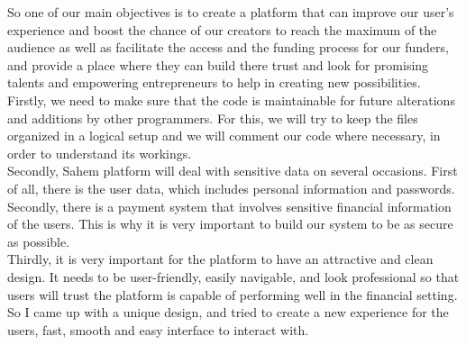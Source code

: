 So one of our main objectives is to create a platform that can improve our user's experience and boost the chance of our creators to reach the maximum of the audience as well as facilitate the access and the funding process for our funders, and provide a place where they can build there trust and look for promising talents and empowering entrepreneurs to help in creating new possibilities.\\
Firstly, we need to make sure
that the code is maintainable for future alterations and additions by other programmers. For this, we will try
to keep the files organized in a logical setup and we will comment our code where necessary, in order to understand
its workings.\\
Secondly, Sahem platform will deal with sensitive data on several occasions. First of all, there
is the user data, which includes personal information and passwords. Secondly, there is a payment system
that involves sensitive financial information of the users. This is why it is very important to build our system
to be as secure as possible.\\
Thirdly, it is very important for the platform to have an attractive and clean design. It needs to be user-friendly, easily navigable, and look professional so that users will trust the platform is capable of performing
well in the financial setting. So I came up with a unique design, and tried to create a new experience for the users, fast,
smooth and easy interface to interact with.
